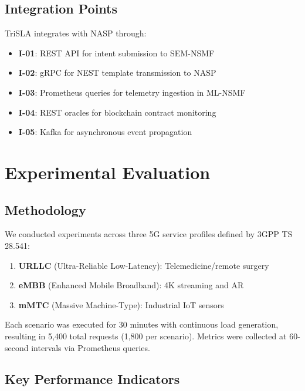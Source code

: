 \documentclass[review]{elsarticle}
\begin{document}
\subsection{Integration Points}

TriSLA integrates with NASP through:
\begin{itemize}
    \item \textbf{I-01}: REST API for intent submission to SEM-NSMF
    \item \textbf{I-02}: gRPC for NEST template transmission to NASP
    \item \textbf{I-03}: Prometheus queries for telemetry ingestion in ML-NSMF
    \item \textbf{I-04}: REST oracles for blockchain contract monitoring
    \item \textbf{I-05}: Kafka for asynchronous event propagation
\end{itemize}

\section{Experimental Evaluation}

\subsection{Methodology}

We conducted experiments across three 5G service profiles defined by 3GPP TS 28.541:
\begin{enumerate}
    \item \textbf{URLLC} (Ultra-Reliable Low-Latency): Telemedicine/remote surgery
    \item \textbf{eMBB} (Enhanced Mobile Broadband): 4K streaming and AR
    \item \textbf{mMTC} (Massive Machine-Type): Industrial IoT sensors
\end{enumerate}

Each scenario was executed for 30 minutes with continuous load generation, resulting in 5,400 total requests (1,800 per scenario). Metrics were collected at 60-second intervals via Prometheus queries.

\subsection{Key Performance Indicators}
\end{document}

